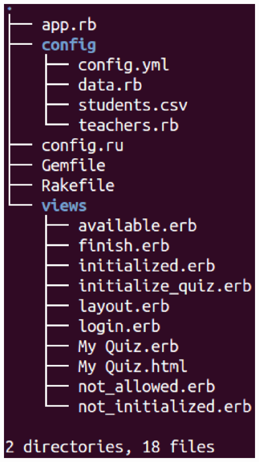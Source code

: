 \documentclass{beamer}
\begin{document}
\begin{frame}[allowframebreaks]
\begin{itemize}
\begin{columns}
\begin{column}{4cm}
\begin{center}
          \includegraphics[width=1\textwidth]{img/tree.eps}
        \end{center}
      \end{column}
    \end{columns}
    
    \framebreak
    

\end{itemize}
\end{frame}
\end{document}
